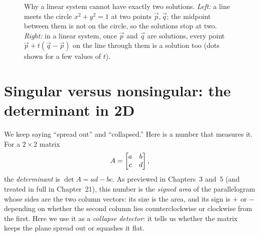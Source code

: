 \begin{figure}[htbp]
\centering
{}
\caption{Why a linear system cannot have exactly two solutions. \emph{Left:}
a line meets the circle $x^2+y^2=1$ at two points $\vec p,\vec q$; the
midpoint between them is not on the circle, so the solutions stop at two.
\emph{Right:} in a linear system, once $\vec p$ and $\vec q$ are solutions,
every point $\vec p+t(\vec q-\vec p)$ on the line through them is a solution
too (dots shown for a few values of $t$).}
\label{ch06:circle}
\end{figure}

\section{Singular versus nonsingular: the determinant in 2D}

We keep saying ``spread out'' and ``collapsed.'' Here is a number that measures it.
For a $2\times 2$ matrix
\[
  A=\begin{bmatrix}a & b\\ c & d\end{bmatrix},
\]
the \emph{determinant} is $\det A = ad-bc$. As previewed in Chapters~3
and~5 (and treated in full in Chapter~21), this number is the \emph{signed
area} of the parallelogram whose sides are the two column vectors: its size
is the area, and its sign is $+$ or $-$ depending on whether the second
column lies counterclockwise or clockwise from the first. Here we use it as
a \emph{collapse detector}: it tells us whether the matrix keeps the plane
spread out or squashes it flat.

